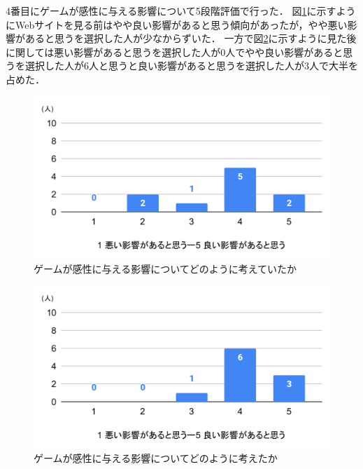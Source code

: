 \documentclass[12pt,a4j,titlepage]{ltjsarticle}
\begin{document}
4番目にゲームが感性に与える影響について5段階評価で行った．
図\ref{fig:感性前}に示すようにWebサイトを見る前はやや良い影響があると思う傾向があったが，やや悪い影響があると思うを選択した人が少なからずいた．
一方で図\ref{fig:感性後}に示すように見た後に関しては悪い影響があると思うを選択した人が0人でやや良い影響があると思うを選択した人が6人と思うと良い影響があると思うを選択した人が3人で大半を占めた．

\begin{figure}[H]
 \begin{center}
  \includegraphics[keepaspectratio, scale=0.6]{PDF/感性前.pdf}
 \end{center}
 \caption{ゲームが感性に与える影響についてどのように考えていたか}
 \label{fig:感性前}
\end{figure}

\begin{figure}[H]
 \begin{center}
  \includegraphics[keepaspectratio, scale=0.6]{PDF/感性後.pdf}
 \end{center}
 \caption{ゲームが感性に与える影響についてどのように考えたか}
 \label{fig:感性後}
\end{figure}
\end{document}
